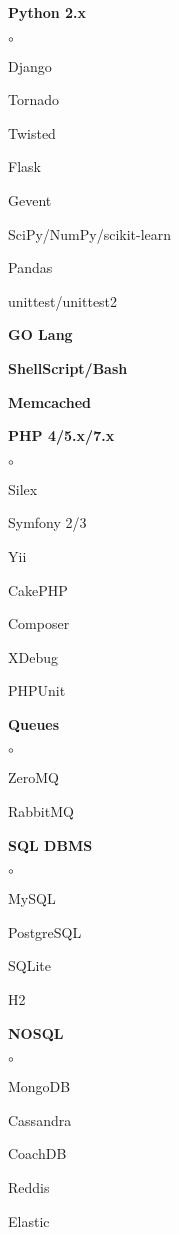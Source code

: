 \documentclass[9pt, a4paper, english]{extarticle}
\begin{document}
  \begin{multicols}{3}
    \begin {list}{\textbullet}{\itemsep=0mm}
      \item \textbf{Python 2.x}
        \begin {list}{$\circ$}{}
          \item Django
          \item Tornado
          \item Twisted
          \item Flask
          \item Gevent
          \item SciPy/NumPy/scikit-learn
          \item Pandas
          \item unittest/unittest2
        \end{list}
      \item \textbf{GO Lang}
      \item \textbf{ShellScript/Bash}
      \item \textbf{Memcached}
      \columnbreak
      \item \textbf{PHP 4/5.x/7.x}
        \begin {list}{$\circ$}{}
          \item Silex
          \item Symfony 2/3
          \item Yii
          \item CakePHP
          \item Composer
          \item XDebug
          \item PHPUnit
        \end{list}
      \item \textbf{Queues}
        \begin {list}{$\circ$}{}
          \item ZeroMQ
          \item RabbitMQ
        \end{list}
      \columnbreak
      \item \textbf{SQL DBMS}
        \begin {list}{$\circ$}{}
          \item MySQL
          \item PostgreSQL
          \item SQLite
          \item H2
        \end{list}
      \item \textbf{NOSQL}
        \begin {list}{$\circ$}{}
          \item MongoDB
          \item Cassandra
          \item CoachDB
          \item Reddis
          \item Elastic
        \end{list}
    \end{list}
  \end{multicols}
\end{document}
